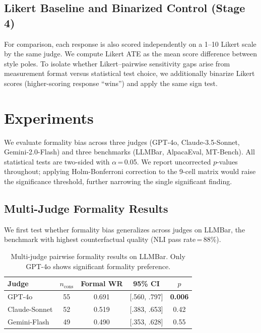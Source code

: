\documentclass[11pt,a4paper]{article}
\begin{document}
\subsection{Likert Baseline and Binarized Control (Stage 4)}

For comparison, each response is also scored independently on a 1--10 Likert scale by the same judge.
We compute Likert ATE as the mean score difference between style poles.
To isolate whether Likert--pairwise sensitivity gaps arise from measurement format versus statistical test choice, we additionally binarize Likert scores (higher-scoring response ``wins'') and apply the same sign test.

\section{Experiments}

We evaluate formality bias across three judges (GPT-4o, Claude-3.5-Sonnet, Gemini-2.0-Flash) and three benchmarks (LLMBar, AlpacaEval, MT-Bench).
All statistical tests are two-sided with $\alpha$\,=\,0.05.
We report uncorrected $p$-values throughout; applying Holm-Bonferroni correction to the 9-cell matrix would raise the significance threshold, further narrowing the single significant finding.

\subsection{Multi-Judge Formality Results}
\label{sec:multi_judge}

We first test whether formality bias generalizes across judges on LLMBar, the benchmark with highest counterfactual quality (NLI pass rate\,=\,88\%).

\begin{table}[t]
\centering
\small
\caption{Multi-judge pairwise formality results on LLMBar. Only GPT-4o shows significant formality preference.}
\label{tab:multi_judge}
\begin{tabular}{lcccc}
\toprule
\textbf{Judge} & \textbf{$n_{\text{cons}}$} & \textbf{Formal WR} & \textbf{95\% CI} & \textbf{$p$} \\
\midrule
GPT-4o & 55 & 0.691 & [.560, .797] & \textbf{0.006} \\
Claude-Sonnet & 52 & 0.519 & [.383, .653] & 0.42 \\
Gemini-Flash & 49 & 0.490 & [.353, .628] & 0.55 \\
\bottomrule
\end{tabular}
\end{table}
\end{document}
